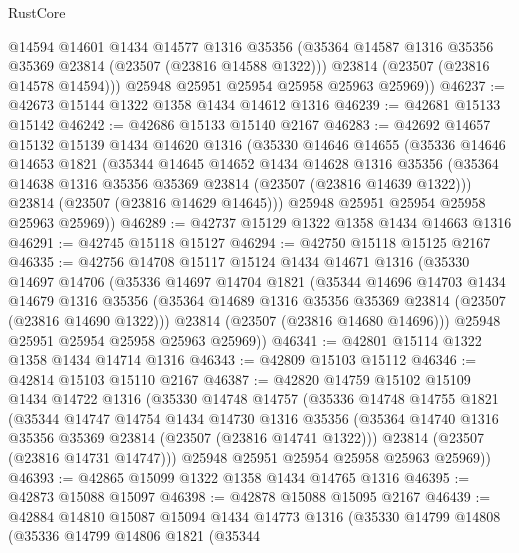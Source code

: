 \begin{lexlean}{RustCore}
\begin{coremodule}
          @14594
          @14601
          @1434
          @14577
          @1316
          @35356
          (@35364 @14587 @1316 @35356 @35369 @23814 (@23507 (@23816 @14588 @1322)))
          @23814
          (@23507 (@23816 @14578 @14594)))
        @25948
        @25951
        @25954
        @25958
        @25963
        @25969))
@46237 := @42673 @15144 @1322 @1358 @1434 @14612 @1316
@46239 := @42681 @15133 @15142
@46242 := @42686 @15133 @15140 @2167
@46283 := @42692
    @14657
    @15132
    @15139
    @1434
    @14620
    @1316
    (@35330
      @14646
      @14655
      (@35336
        @14646
        @14653
        @1821
        (@35344
          @14645
          @14652
          @1434
          @14628
          @1316
          @35356
          (@35364 @14638 @1316 @35356 @35369 @23814 (@23507 (@23816 @14639 @1322)))
          @23814
          (@23507 (@23816 @14629 @14645)))
        @25948
        @25951
        @25954
        @25958
        @25963
        @25969))
@46289 := @42737 @15129 @1322 @1358 @1434 @14663 @1316
@46291 := @42745 @15118 @15127
@46294 := @42750 @15118 @15125 @2167
@46335 := @42756
    @14708
    @15117
    @15124
    @1434
    @14671
    @1316
    (@35330
      @14697
      @14706
      (@35336
        @14697
        @14704
        @1821
        (@35344
          @14696
          @14703
          @1434
          @14679
          @1316
          @35356
          (@35364 @14689 @1316 @35356 @35369 @23814 (@23507 (@23816 @14690 @1322)))
          @23814
          (@23507 (@23816 @14680 @14696)))
        @25948
        @25951
        @25954
        @25958
        @25963
        @25969))
@46341 := @42801 @15114 @1322 @1358 @1434 @14714 @1316
@46343 := @42809 @15103 @15112
@46346 := @42814 @15103 @15110 @2167
@46387 := @42820
    @14759
    @15102
    @15109
    @1434
    @14722
    @1316
    (@35330
      @14748
      @14757
      (@35336
        @14748
        @14755
        @1821
        (@35344
          @14747
          @14754
          @1434
          @14730
          @1316
          @35356
          (@35364 @14740 @1316 @35356 @35369 @23814 (@23507 (@23816 @14741 @1322)))
          @23814
          (@23507 (@23816 @14731 @14747)))
        @25948
        @25951
        @25954
        @25958
        @25963
        @25969))
@46393 := @42865 @15099 @1322 @1358 @1434 @14765 @1316
@46395 := @42873 @15088 @15097
@46398 := @42878 @15088 @15095 @2167
@46439 := @42884
    @14810
    @15087
    @15094
    @1434
    @14773
    @1316
    (@35330
      @14799
      @14808
      (@35336
        @14799
        @14806
        @1821
        (@35344

\end{coremodule}
\end{lexlean}
